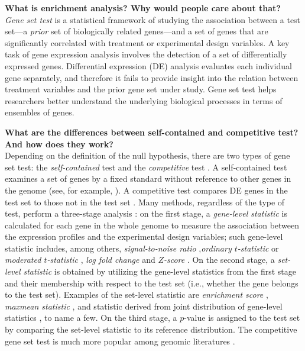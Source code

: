 \documentclass[useAMS,usenatbib, galley]{biom}
\begin{document}
	\textbf{What is enrichment analysis? Why would people care about that?}\\
	\textit{Gene set test} is a statistical framework of studying the association between a test set---a \textit{prior} set of biologically related genes---and a set of genes that are significantly correlated with treatment or experimental design variables. A key task of gene expression analysis involves the detection of a set of differentially expressed genes. Differential expression (DE) analysis  evaluates each individual gene separately, and therefore it fails to provide insight into the relation between treatment variables and the prior gene set under study. Gene set test helps researchers better understand the underlying biological processes in terms of ensembles of genes.
	
	\textbf{What are the differences between self-contained and competitive test? And how does they work?}\\
	Depending on the definition of the null hypothesis, there are two types of gene set test: the \textit{self-contained} test and the \textit{competitive} test \citep{goeman2007analyzing}. A self-contained test examines a set of genes by a fixed standard without reference to other genes in the genome (see, for example, \cite{goeman2004global,goeman2005testing, tsai2009multivariate, wu2010roast, huang2013gene}). A competitive test compares DE
	genes in the test set to those not in the test set \citep{tian2005discovering, wu2012camera, yaari2013quantitative}. Many methods, regardless of the type of test, perform a three-stage analysis \citep{khatri2012ten}: on the first stage, a \textit{gene-level statistic} is calculated for each gene in the whole genome to measure the association between the expression profiles and the experimental design variables; such gene-level statistic includes, among others, \textit{signal-to-noise ratio} \citep{subramanian2005gene},\textit{ordinary $t$-statistic} \citep{tian2005discovering} or \textit{moderated $t$-statistic} \citep{Smyth2004moderated}, \textit{log fold change} \citep{kim2005page} and \textit{$Z$-score} \citep{efron2007correlation}. On the second stage, a \textit{set-level statistic} is obtained by utilizing the gene-level statistics from the first stage and their membership with respect to the test set (i.e., whether the gene belongs to the test set). Examples of the set-level statistic are \textit{enrichment score} \citep{subramanian2005gene}, \textit{maxmean statistic} \citep{efron2007testing}, and statistic derived from joint distribution of gene-level statistics \citep{yaari2013quantitative}, to name a few. On the third stage, a $p$-value is assigned to the test set by comparing the set-level statistic to its reference distribution. The competitive gene set test is much more popular among genomic literatures \citep{goeman2007analyzing, gatti2010heading}.  
	
\end{document}
